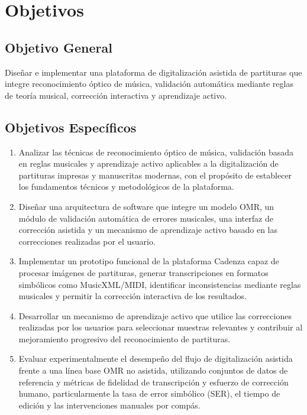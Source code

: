 \section{Objetivos}

\subsection{Objetivo General}
\label{sec:objetivo-general}

Dise\~nar e implementar una plataforma de digitalizaci\'on asistida de partituras que integre reconocimiento \'optico de m\'usica, validaci\'on autom\'atica mediante reglas de teor\'ia musical, correcci\'on interactiva y aprendizaje activo.

\subsection{Objetivos Espec\'ificos}
\label{sec:objetivos-especificos}

\begin{enumerate}
    \item Analizar las t\'ecnicas de reconocimiento \'optico de m\'usica, validaci\'on basada en reglas musicales y aprendizaje activo aplicables a la digitalizaci\'on de partituras impresas y manuscritas modernas, con el prop\'osito de establecer los fundamentos t\'ecnicos y metodol\'ogicos de la plataforma.

    \item Dise\~nar una arquitectura de software que integre un modelo OMR, un m\'odulo de validaci\'on autom\'atica de errores musicales, una interfaz de correcci\'on asistida y un mecanismo de aprendizaje activo basado en las correcciones realizadas por el usuario.

    \item Implementar un prototipo funcional de la plataforma Cadenza capaz de procesar im\'agenes de partituras, generar transcripciones en formatos simb\'olicos como MusicXML/MIDI, identificar inconsistencias mediante reglas musicales y permitir la correcci\'on interactiva de los resultados.

    \item Desarrollar un mecanismo de aprendizaje activo que utilice las correcciones realizadas por los usuarios para seleccionar muestras relevantes y contribuir al mejoramiento progresivo del reconocimiento de partituras.

    \item Evaluar experimentalmente el desempe\~no del flujo de digitalizaci\'on asistida frente a una l\'inea base OMR no asistida, utilizando conjuntos de datos de referencia y m\'etricas de fidelidad de transcripci\'on y esfuerzo de correcci\'on humano, particularmente la tasa de error simb\'olico (SER), el tiempo de edici\'on y las intervenciones manuales por comp\'as.
\end{enumerate}

